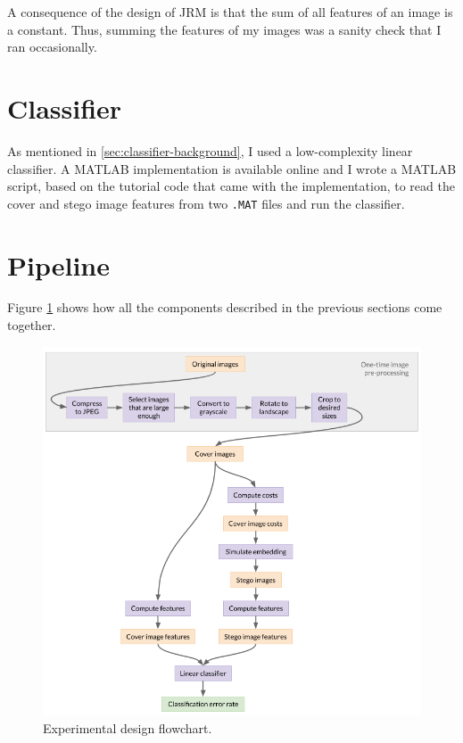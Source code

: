 \documentclass[11pt,a4paper,twoside,openright]{report}
\begin{document}
A consequence of the design of JRM is that the sum of all features of an image is a constant. Thus, summing the features of my images was a sanity check that I ran occasionally.


\section{Classifier} \label{sec:classifier-impl}

As mentioned in \ref{sec:classifier-background}, I used a low-complexity linear classifier. A MATLAB implementation is available online \cite{binghamton-classifier} and I wrote a MATLAB script, based on the tutorial code that came with the implementation, to read the cover and stego image features from two \texttt{.MAT} files and run the classifier.


\section{Pipeline} \label{sec:pipeline}

Figure \ref{fig:experimental-design-flowchart} shows how all the components described in the previous sections come together.

\begin{figure}[htbp]
	\begin{center}
		\includegraphics[width=\linewidth]{experimental_design_diagram.png}
		\caption{Experimental design flowchart.}
		\label{fig:experimental-design-flowchart}
	\end{center}
\end{figure}
\end{document}

